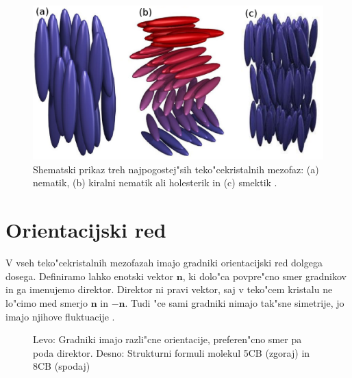 \documentclass[12pt,twoside,openright,final]{report}
\begin{document}
\begin{figure}[h]
\centering
  \includegraphics[width=.8\textwidth]{faze}
 \caption{Shematski prikaz treh najpogostej"sih teko"cekristalnih mezofaz: (a) nematik, (b) kiralni nematik ali holesterik in (c) smektik \cite{barrett:lc}.}
  \label{fig:faze}
\end{figure}

\section{Orientacijski red}

V vseh teko"cekristalnih mezofazah imajo gradniki orientacijski red dolgega dosega. 
Definiramo lahko enotski vektor $\mathbf{n}$, ki dolo"ca povpre"cno smer gradnikov in ga imenujemo direktor. 
Direktor ni pravi vektor, saj v teko"cem kristalu ne lo"cimo med smerjo $\mathbf{n}$ in $\mathbf{-n}$. 
Tudi "ce sami gradniki nimajo tak"sne simetrije, jo imajo njihove fluktuacije \cite{mermin}. 

\begin{figure}[h]
\begin{center}
 \caption{Levo: Gradniki imajo razli"cne orientacije, preferen"cno smer pa poda direktor. Desno: Strukturni formuli molekul 5CB (zgoraj) in 8CB (spodaj) \cite{wiki:lc}}
 \label{fig:nematik-direktor}
 \end{center}
\end{figure}
\end{document}
